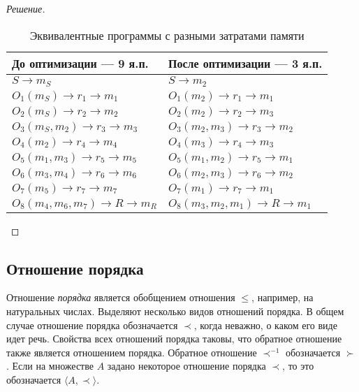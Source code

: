 \begin{proof}[Решение]
    \begin{table}
        \centering
        \begin{tabular}{l||l}
            \hline\hline
            До оптимизации --- 9 я.п.      & После оптимизации --- 3 я.п.   \\
            \hline\hline
            $S \to m_S$                    &  $S\to m_2$                    \\ \hline
            $O_1(m_S)\to r_1 \to m_1$      &  $O_1(m_2)\to r_1 \to m_1$     \\
            $O_2(m_S)\to r_2 \to m_2$      &  $O_2(m_2)\to r_2 \to m_3$     \\ \hline
            $O_3(m_S,m_2)\to r_3 \to m_3$  &  $O_3(m_2,m_3)\to r_3 \to m_2$ \\
            $O_4(m_2)\to r_4 \to m_4$      &  $O_4(m_3)\to r_4 \to m_3$     \\ \hline
            $O_5(m_1,m_3)\to r_5 \to m_5$  &  $O_5(m_1,m_2)\to r_5 \to m_1$ \\
            $O_6(m_3,m_4)\to r_6 \to m_6$  &  $O_6(m_2,m_3)\to r_6 \to m_2$ \\ \hline
            $O_7(m_5)\to r_7 \to m_7$      &  $O_7(m_1)\to r_7 \to m_1$     \\ \hline
            $O_8(m_4,m_6,m_7)\to R \to m_R$&  $O_8(m_3,m_2,m_1)\to R\to m_1$\\ \hline
        \end{tabular}
        \caption{Эквивалентные программы с разными затратами памяти}
        \label{table:bo:calcFlowProgramEx}
    \end{table}    
\end{proof}


\subsection{Отношение порядка}

Отношение \emph{порядка} является обобщением отношения $\leq$, например, на натуральных числах. Выделяют несколько видов отношений порядка. В общем случае отношение порядка обозначается $\prec$, когда неважно, о каком его виде идет речь. Свойства всех отношений порядка таковы, что обратное отношение также является отношением порядка. Обратное отношение $\prec^{-1}$ обозначается $\succ$. Если на множестве $A$ задано некоторое отношение порядка $\prec$, то это обозначается $\langle A,\prec\rangle$.

